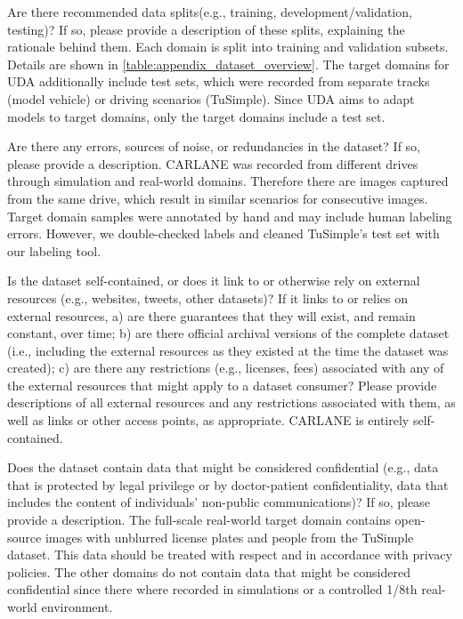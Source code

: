 \documentclass{article}
\begin{document}
	\begin{datasheetitem}{Are there recommended data splits(e.g., training, development/validation, testing)? \normalfont If so, please provide a description of these splits, explaining the rationale behind them.}
		Each domain is split into training and validation subsets. Details are shown in \autoref{table:appendix_dataset_overview}. The target domains for UDA additionally include test sets, which were recorded from separate tracks (model vehicle) or driving scenarios (TuSimple). Since UDA aims to adapt models to target domains, only the target domains include a test set.
	\end{datasheetitem}
	\begin{datasheetitem}{Are there any errors, sources of noise, or redundancies in the dataset? \normalfont If so, please provide a description.}
		CARLANE was recorded from different drives through simulation and real-world domains. Therefore there are images captured from the same drive, which result in similar scenarios for consecutive images. Target domain samples were annotated by hand and may include human labeling errors. However, we double-checked labels and cleaned TuSimple's test set with our labeling tool.  
	\end{datasheetitem}
	\begin{datasheetitem}{Is the dataset self-contained, or does it link to or otherwise rely on external resources (e.g., websites, tweets, other datasets)? \normalfont If it links to or relies on external resources, a) are there guarantees that they will exist, and remain constant, over time; b) are there official archival versions of the complete dataset (i.e., including the external resources as they existed at the time the dataset was created); c) are there any restrictions (e.g., licenses, fees) associated with any of the external resources that might apply to a dataset consumer? Please provide descriptions of all external resources and any restrictions associated with them, as well as links or other access points, as appropriate.}
		CARLANE is entirely self-contained.
	\end{datasheetitem}
	\begin{datasheetitem}{Does the dataset contain data that might be considered confidential (e.g., data that is protected by legal privilege or by doctor-patient confidentiality, data that includes the content of individuals’ non-public communications)? \normalfont If so, please provide a description.}
		The full-scale real-world target domain contains open-source images with unblurred license plates and people from the TuSimple dataset. This data should be treated with respect and in accordance with privacy policies. The other domains do not contain data that might be considered confidential since there where recorded in simulations or a controlled 1/8th real-world environment.
	\end{datasheetitem}
\end{document}

